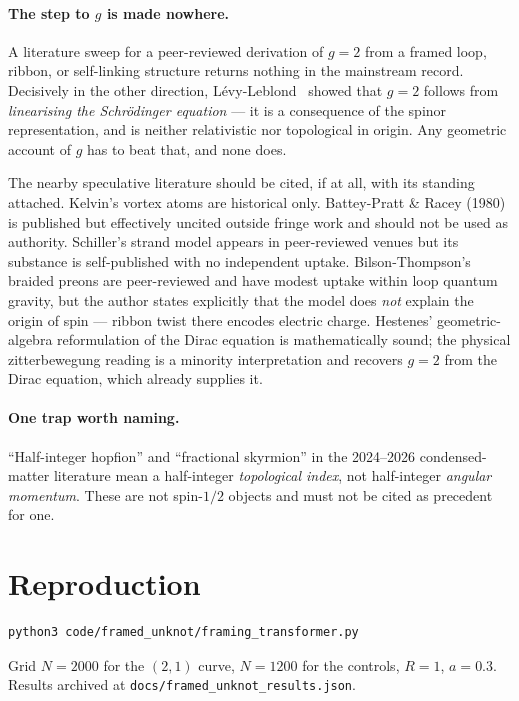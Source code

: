 \documentclass[11pt,a4paper]{article}
\begin{document}
\paragraph{The step to $g$ is made nowhere.}
A literature sweep for a peer-reviewed derivation of $g=2$ from a framed
loop, ribbon, or self-linking structure returns nothing in the mainstream
record.  Decisively in the other direction,
L\'evy-Leblond~\cite{levyleblond1967} showed that $g=2$ follows from
\emph{linearising the Schr\"odinger equation} --- it is a consequence of
the spinor representation, and is neither relativistic nor topological in
origin.  Any geometric account of $g$ has to beat that, and none does.

The nearby speculative literature should be cited, if at all, with its
standing attached.  Kelvin's vortex atoms are historical only.
Battey-Pratt \& Racey (1980) is published but effectively uncited outside
fringe work and should not be used as authority.  Schiller's strand model
appears in peer-reviewed venues but its substance is self-published with
no independent uptake.  Bilson-Thompson's braided preons are
peer-reviewed and have modest uptake within loop quantum gravity, but the
author states explicitly that the model does \emph{not} explain the
origin of spin --- ribbon twist there encodes electric charge.  Hestenes'
geometric-algebra reformulation of the Dirac equation is mathematically
sound; the physical zitterbewegung reading is a minority interpretation
and recovers $g=2$ from the Dirac equation, which already supplies it.

\paragraph{One trap worth naming.}
``Half-integer hopfion'' and ``fractional skyrmion'' in the 2024--2026
condensed-matter literature mean a half-integer \emph{topological index},
not half-integer \emph{angular momentum}.  These are not spin-$1/2$
objects and must not be cited as precedent for one.

\section*{Reproduction}

\begin{verbatim}
python3 code/framed_unknot/framing_transformer.py
\end{verbatim}
Grid $N = 2000$ for the $(2,1)$ curve, $N = 1200$ for the controls,
$R = 1$, $a = 0.3$.  Results archived at
\nolinkurl{docs/framed_unknot_results.json}.
\end{document}

